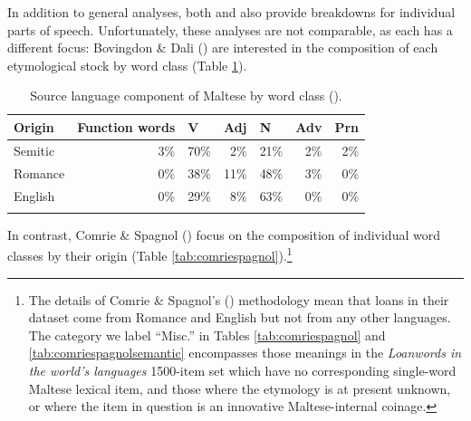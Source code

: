 \documentclass[output=paper]{langsci/langscibook}
\begin{document}
In addition to general analyses, both \cite{bovingdondalli2006} and \cite{comriespagnol2016} also provide breakdowns for individual parts of speech. Unfortunately, these analyses are not comparable, as each has a different focus: Bovingdon \& Dali (\citeyear[71]{bovingdondalli2006}) are interested in the composition of each etymological stock by word class (Table \ref{tab:posbovingdon}).
\begin{table}[H]
\caption{Source language component of Maltese by word class (\citealt[71]{bovingdondalli2006}).}
\label{tab:posbovingdon}
\begin{tabular}{lllllll}
\lsptoprule
Origin & Function words & V & Adj & N & Adv & Prn\\
\midrule
Semitic & \multicolumn{1}{r}{3\%} & \multicolumn{1}{r}{70\%} & \multicolumn{1}{r}{2\%} 
& \multicolumn{1}{r}{21\%} & \multicolumn{1}{r}{2\%} & \multicolumn{1}{r}{2\%} \\
Romance & \multicolumn{1}{r}{0\%} & \multicolumn{1}{r}{38\%} & \multicolumn{1}{r}{11\%} 
& \multicolumn{1}{r}{48\%} & \multicolumn{1}{r}{3\%} & \multicolumn{1}{r}{0\%} \\
English & \multicolumn{1}{r}{0\%} & \multicolumn{1}{r}{29\%} & \multicolumn{1}{r}{8\%} & \multicolumn{1}{r}{63\%}
& \multicolumn{1}{r}{0\%} & \multicolumn{1}{r}{0\%} \\
\lspbottomrule
\end{tabular}
\end{table}
In contrast, Comrie \& Spagnol (\citeyear[328]{comriespagnol2016}) focus on the composition of individual word classes by their origin (Table \ref{tab:comriespagnol}).\footnote{The details of Comrie \& Spagnol's (\citeyear{comriespagnol2016}) methodology mean that loans in their dataset come from Romance and English but not from any other languages. The category we label ``Misc.'' in Tables \ref{tab:comriespagnol} and \ref{tab:comriespagnolsemantic} encompasses those meanings in the \textit{Loanwords in the world's languages} 1500-item set which have no corresponding single-word Maltese lexical item, and those where the etymology is at present unknown, or where the item in question is an innovative Maltese-internal coinage.}
\end{document}

